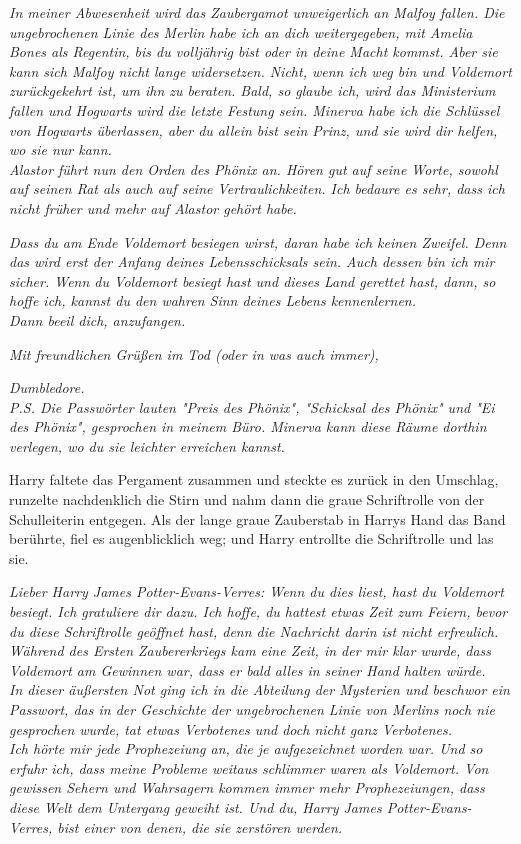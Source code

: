 {\emph{In meiner Abwesenheit wird das Zaubergamot unweigerlich an Malfoy fallen. Die ungebrochenen Linie des Merlin habe ich an dich weitergegeben, mit Amelia Bones als Regentin, bis du volljährig bist oder in deine Macht kommst. Aber sie kann sich Malfoy nicht lange widersetzen. Nicht, wenn ich weg bin und Voldemort zurückgekehrt ist, um ihn zu beraten. Bald, so glaube ich, wird das Ministerium fallen und Hogwarts wird die letzte Festung sein. Minerva habe ich die Schlüssel von Hogwarts überlassen, aber du allein bist sein Prinz, und sie wird dir helfen, wo sie nur kann.}\\ \emph{\hfill\break Alastor führt nun den Orden des Phönix an. Hören gut auf seine Worte, sowohl auf seinen Rat als auch auf seine Vertraulichkeiten. Ich bedaure es sehr, dass ich nicht früher und mehr auf Alastor gehört habe.}

\emph{Dass du am Ende Voldemort besiegen wirst, daran habe ich keinen Zweifel. Denn das wird erst der Anfang deines Lebensschicksals sein. Auch dessen bin ich mir sicher. Wenn du Voldemort besiegt hast und dieses Land gerettet hast, dann, so hoffe ich, kannst du den wahren Sinn deines Lebens kennenlernen.}\\ \emph{\hfill\break Dann beeil dich, anzufangen.}

\emph{Mit freundlichen Grüßen im Tod (oder in was auch immer),}

\emph{Dumbledore.}\\ \emph{\hfill\break P.S. Die Passwörter lauten "Preis des Phönix", "Schicksal des Phönix" und "Ei des Phönix", gesprochen in meinem Büro. Minerva kann diese Räume dorthin verlegen, wo du sie leichter erreichen kannst.}

Harry faltete das Pergament zusammen und steckte es zurück in den Umschlag, runzelte nachdenklich die Stirn und nahm dann die graue Schriftrolle von der Schulleiterin entgegen. Als der lange graue Zauberstab in Harrys Hand das Band berührte, fiel es augenblicklich weg; und Harry entrollte die Schriftrolle und las sie.

\emph{Lieber Harry James Potter-Evans-Verres: Wenn du dies liest, hast du Voldemort besiegt. Ich gratuliere dir dazu. Ich hoffe, du hattest etwas Zeit zum Feiern, bevor du diese Schriftrolle geöffnet hast, denn die Nachricht darin ist nicht erfreulich.}\\ \emph{\hfill\break Während des Ersten Zaubererkriegs kam eine Zeit, in der mir klar wurde, dass Voldemort am Gewinnen war, dass er bald alles in seiner Hand halten würde.\\ In dieser äußersten Not ging ich in die Abteilung der Mysterien und beschwor ein Passwort, das in der Geschichte der ungebrochenen Linie von Merlins noch nie gesprochen wurde, tat etwas Verbotenes und doch nicht ganz Verbotenes.}\\ \emph{\hfill\break Ich hörte mir jede Prophezeiung an, die je aufgezeichnet worden war. Und so erfuhr ich, dass meine Probleme weitaus schlimmer waren als Voldemort. Von gewissen Sehern und Wahrsagern kommen immer mehr Prophezeiungen, dass diese Welt dem Untergang geweiht ist. Und du, Harry James Potter-Evans-Verres, bist einer von denen, die sie zerstören werden.}

}
